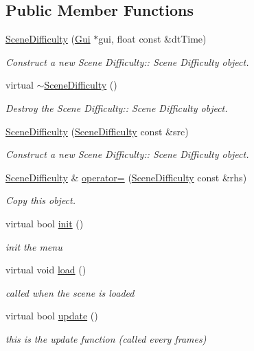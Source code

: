 \subsection*{Public Member Functions}
\begin{DoxyCompactItemize}
\item 
\hyperlink{class_scene_difficulty_a15de9e867dd52a66a55c8e80e50e8e82}{Scene\+Difficulty} (\hyperlink{class_gui}{Gui} $\ast$gui, float const \&dt\+Time)
\begin{DoxyCompactList}\small\item\em Construct a new Scene Difficulty\+:\+: Scene Difficulty object. \end{DoxyCompactList}\item 
\mbox{\label{class_scene_difficulty_a4379d90a265aa670a1a5b21dbbc79049}} 
virtual \hyperlink{class_scene_difficulty_a4379d90a265aa670a1a5b21dbbc79049}{$\sim$\+Scene\+Difficulty} ()
\begin{DoxyCompactList}\small\item\em Destroy the Scene Difficulty\+:\+: Scene Difficulty object. \end{DoxyCompactList}\item 
\hyperlink{class_scene_difficulty_acdc2735a42657e7c6f2b905d59f3d743}{Scene\+Difficulty} (\hyperlink{class_scene_difficulty}{Scene\+Difficulty} const \&src)
\begin{DoxyCompactList}\small\item\em Construct a new Scene Difficulty\+:\+: Scene Difficulty object. \end{DoxyCompactList}\item 
\hyperlink{class_scene_difficulty}{Scene\+Difficulty} \& \hyperlink{class_scene_difficulty_a89872867aa3b6ae5d58e2b3f1f373a66}{operator=} (\hyperlink{class_scene_difficulty}{Scene\+Difficulty} const \&rhs)
\begin{DoxyCompactList}\small\item\em Copy this object. \end{DoxyCompactList}\item 
virtual bool \hyperlink{class_scene_difficulty_a7fb9dd5ee9d623e346d917cd7a5db956}{init} ()
\begin{DoxyCompactList}\small\item\em init the menu \end{DoxyCompactList}\item 
\mbox{\label{class_scene_difficulty_a98d9e4aa50d9092575b343cf0d445f36}} 
virtual void \hyperlink{class_scene_difficulty_a98d9e4aa50d9092575b343cf0d445f36}{load} ()
\begin{DoxyCompactList}\small\item\em called when the scene is loaded \end{DoxyCompactList}\item 
virtual bool \hyperlink{class_scene_difficulty_a2a3d3328b04df7047cc03725a9c5eb3c}{update} ()
\begin{DoxyCompactList}\small\item\em this is the update function (called every frames) \end{DoxyCompactList}\end{DoxyCompactItemize}
